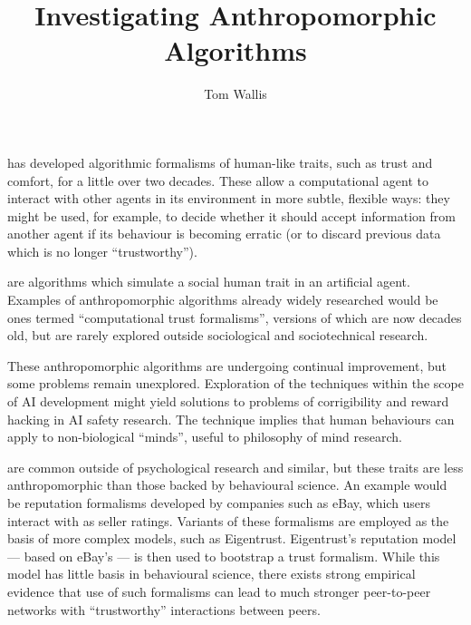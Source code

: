 

\author{Tom Wallis}
\title{Investigating Anthropomorphic Algorithms}
\date{}



\maketitle


 has developed algorithmic formalisms of human-like traits, such as trust and comfort, for a little over two decades. These allow a computational agent to interact with other agents in its environment in more subtle, flexible ways: they might be used, for example, to decide whether it should accept information from another agent if its behaviour is becoming erratic (or to discard previous data which is no longer ``trustworthy'').\par

 are algorithms which simulate a social human trait in an artificial agent. Examples of anthropomorphic algorithms already widely researched would be ones termed ``computational trust formalisms'', versions of which are now decades old\cite{marsh1994}, but are rarely explored outside sociological and sociotechnical research.\par

These anthropomorphic algorithms are undergoing continual improvement\cite{kramdi, Urbano2014}, but some problems remain unexplored. Exploration of the techniques within the scope of AI development might yield solutions to problems of corrigibility\cite{corrigibility} and reward hacking\cite{concrete_problems} in AI safety research. The technique implies that human behaviours can apply to non-biological ``minds'', useful to philosophy of mind research\cite{sloman_spaceofminds}.\par 

 are common outside of psychological research and similar, but these traits are less anthropomorphic than those backed by behavioural science. An example would be reputation formalisms developed by companies such as eBay, which users interact with as seller ratings. Variants of these formalisms are employed as the basis of more complex models, such as Eigentrust\cite{kamvar2003eigentrust}. Eigentrust's reputation model --- based on eBay's --- is then used to bootstrap a trust formalism. While this model has little basis in behavioural science, there exists strong empirical evidence that use of such formalisms can lead to much stronger peer-to-peer networks with ``trustworthy'' interactions between peers.\par

